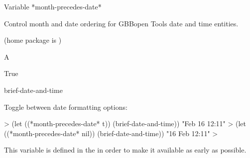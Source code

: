 \documentclass[10pt,twoside,english,pdftex]{article}
\begin{document}
\begin{functiondoc}{Variable}%
{*month-precedes-date*}{}%

\fnsyntax

\fnpurpose Control month and date ordering for GBBopen Tools date and time
entities.

\fnpackage {} (home package is )

\fnmodule {}

\fnvaluetype A 

\fninitialvalue True

\begin{alsos}{brief-date-and-time}
\end{alsos}

\fnexamples
Toggle between date formatting options:
%
\W\supp
\begin{example}
  > (let ((*month-precedes-date* t))
      (brief-date-and-time))
  "Feb 16 12:11"
  > (let ((*month-precedes-date* nil))
      (brief-date-and-time))
  "16 Feb 12:11"
  >
\end{example}

\fnnote
{}%
%
%
This variable is defined in the   in order to
make it available as early as possible.

\end{functiondoc}

\end{document}
